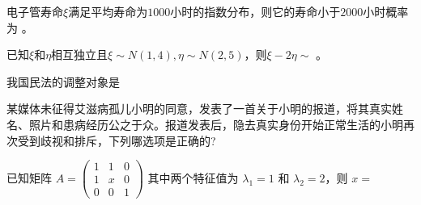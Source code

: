 \documentclass{jnuexam}
\begin{document}
\vfill

\begin{problem}
电子管寿命$\xi$满足平均寿命为$1000$小时的指数分布，则它的寿命小于$2000$小时概率为 。
\end{problem}

\vfill

\begin{problem}
已知$\xi$和$\eta$相互独立且$\xi\sim N(1,4), \eta\sim N(2,5)$，则$\xi-2\eta\sim$ 。
\end{problem}

\vfill

\newpagea %


\newpageb %

\begin{problem}
我国民法的调整对象是 
\end{problem}

\vfill

\begin{problem}
某媒体未征得艾滋病孤儿小明的同意，发表了一首关于小明的报道，将其真实姓名、照片和患病经历公之于众。报道发表后，隐去真实身份开始正常生活的小明再次受到歧视和排斥，下列哪选项是正确的? 
\end{problem}

\vfill

\begin{problem}
已知矩阵 $A = \left(\begin{array}{ccc}
  1 & 1 & 0\\
  1 & x & 0\\
  0 & 0 & 1
\end{array}\right)$ 其中两个特征值为 $\lambda_1 = 1$ 和 $\lambda_2
= 2$，则 $x=$ 
\end{problem}

\vfill
\end{document}
